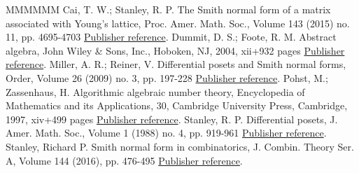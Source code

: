 \begin{thebibliography}{MMMMMM}
 Cai, T. W.; Stanley, R. P. The Smith normal form of a matrix associated with Young’s lattice, Proc. Amer. Math. Soc., Volume 143 (2015) no. 11, pp. 4695-4703 \href{https://alco.centre-mersenne.org/articles/10.5802/alco.393/#SNFforYoung}{Publisher reference}.
 Dummit, D. S.; Foote, R. M. Abstract algebra, John Wiley \& Sons, Inc., Hoboken, NJ, 2004, xii+932 pages \href{https://alco.centre-mersenne.org/articles/10.5802/alco.393/#D&F}{Publisher reference}.
 Miller, A. R.; Reiner, V. Differential posets and Smith normal forms, Order, Volume 26 (2009) no. 3, pp. 197-228 \href{https://alco.centre-mersenne.org/articles/10.5802/alco.393/#Miller}{Publisher reference}.
 Pohst, M.; Zassenhaus, H. Algorithmic algebraic number theory, Encyclopedia of Mathematics and its Applications, 30, Cambridge University Press, Cambridge, 1997, xiv+499 pages \href{https://alco.centre-mersenne.org/articles/10.5802/alco.393/#Zassenhaus}{Publisher reference}.
 Stanley, R. P. Differential posets, J. Amer. Math. Soc., Volume 1 (1988) no. 4, pp. 919-961 \href{https://alco.centre-mersenne.org/articles/10.5802/alco.393/#Stanley88}{Publisher reference}.
 Stanley, Richard P. Smith normal form in combinatorics, J. Combin. Theory Ser. A, Volume 144 (2016), pp. 476-495 \href{https://alco.centre-mersenne.org/articles/10.5802/alco.393/#SNFsurvey}{Publisher reference}.
\end{thebibliography}
